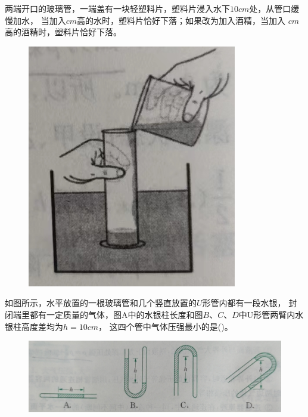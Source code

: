 \documentclass[a4paper,cs4size]{BHCexam}
\begin{document}
\begin{groups}
\begin{questions}[]
        \question[5] 两端开口的玻璃管，一端盖有一块轻塑料片，塑料片浸入水下$10cm$处，从管口缓慢加水，
        当加入\underline{\quad\quad\quad\quad}$cm$高的水时，塑料片恰好下落；如果改为加入酒精，当加入
        \underline{\quad\quad\quad\quad}$cm$高的酒精时，塑料片恰好下落。
        \begin{figure}[htb]
            \flushright
            \includegraphics [scale=0.4,trim=0 0 0 0]{./image/physics_pressure2_4.png}
            \label{fig:fig_pressure2_4}
        \end{figure}
        \vspace{1.5cm}

        \question[5] 如图所示，水平放置的一根玻璃管和几个竖直放置的$U$形管内都有一段水银，
        封闭端里都有一定质量的气体，图A中的水银柱长度和图$B$、$C$、$D$中U形管两臂内水银柱高度差均为$h=10cm$，
        这四个管中气体压强最小的是(\quad\quad\quad)。
        \begin{figure}[htb]
            \includegraphics [scale=0.8,trim=0 0 0 0]{./image/physics_pressure2_5.png}
            \label{fig:fig_pressure2_5}
        \end{figure}
        \vspace{0.5cm}


\end{questions}
\end{groups}
\end{document}
